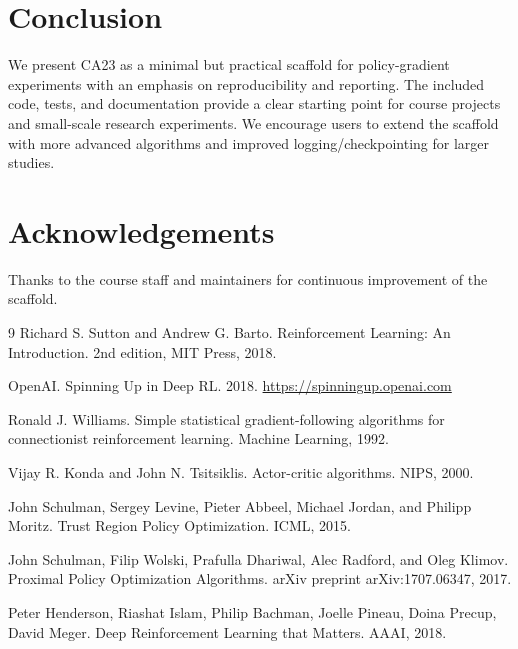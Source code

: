 \documentclass[11pt]{article}
\begin{document}
\section{Conclusion}
We present CA23 as a minimal but practical scaffold for policy-gradient
experiments with an emphasis on reproducibility and reporting. The included
code, tests, and documentation provide a clear starting point for course
projects and small-scale research experiments. We encourage users to extend the
scaffold with more advanced algorithms and improved logging/checkpointing for
larger studies.

\section*{Acknowledgements}
Thanks to the course staff and maintainers for continuous improvement of the
scaffold.

\begin{thebibliography}{9}
Richard S. Sutton and Andrew G. Barto. Reinforcement Learning: An Introduction. 2nd edition, MIT Press, 2018.

OpenAI. Spinning Up in Deep RL. 2018. \url{https://spinningup.openai.com}

Ronald J. Williams. Simple statistical gradient-following algorithms for connectionist reinforcement learning. Machine Learning, 1992.

Vijay R. Konda and John N. Tsitsiklis. Actor-critic algorithms. NIPS, 2000.

John Schulman, Sergey Levine, Pieter Abbeel, Michael Jordan, and Philipp Moritz. Trust Region Policy Optimization. ICML, 2015.

John Schulman, Filip Wolski, Prafulla Dhariwal, Alec Radford, and Oleg Klimov. Proximal Policy Optimization Algorithms. arXiv preprint arXiv:1707.06347, 2017.

Peter Henderson, Riashat Islam, Philip Bachman, Joelle Pineau, Doina Precup, David Meger. Deep Reinforcement Learning that Matters. AAAI, 2018.
\end{thebibliography}
\end{document}
